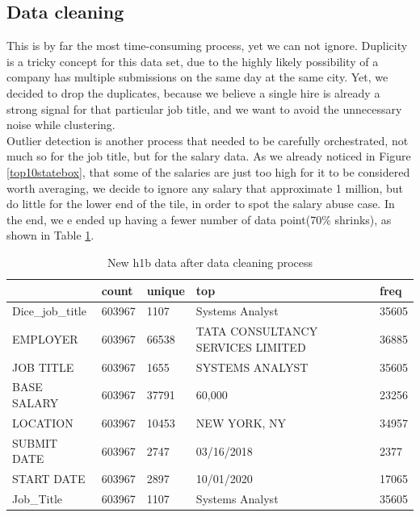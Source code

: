 \subsection{Data cleaning}
This is by far the most time-consuming process, yet we can not ignore. Duplicity is a tricky concept for this data set, due to the highly likely possibility of a company has multiple submissions on the same day at the same city. Yet, we decided to drop the duplicates, because we believe a single hire is already a strong signal for that particular job title, and we want to avoid the unnecessary noise while clustering. \\
Outlier detection is another process that needed to be carefully orchestrated, not  much so for the job title, but for the salary data. As we already noticed in Figure \ref{top10statebox}, that some of the salaries are just too high for it to be considered worth averaging, we decide to ignore any salary that approximate 1 million, but do little for the lower end of the tile, in order to spot the salary abuse case. In the end, we e ended up having a fewer number of data point(70$\%$ shrinks), as shown in Table \ref{newdata}.
\begin{table}[h!]
	\caption{New h1b data after data cleaning process}
	\label{newdata}
	\resizebox{\columnwidth}{!}
	{%
		
		\begin{tabular}{lllll}
			\hline
			{} &   count & unique &                                                top &   freq \\
			\hline
			Dice\_job\_title &  603967 &   1107 &                                    Systems Analyst &  35605 \\
			EMPLOYER       &  603967 &  66538 &                  TATA CONSULTANCY SERVICES LIMITED &  36885 \\
			JOB TITLE      &  603967 &   1655 &                                    SYSTEMS ANALYST &  35605 \\
			BASE SALARY    &  603967 &  37791 &                                             60,000 &  23256 \\
			LOCATION       &  603967 &  10453 &                                       NEW YORK, NY &  34957 \\
			SUBMIT DATE    &  603967 &   2747 &                                         03/16/2018 &   2377 \\
			START DATE     &  603967 &   2897 &                                         10/01/2020 &  17065 \\
			Job\_Title      &  603967 &   1107 &                                    Systems Analyst &  35605 \\
			\hline
		\end{tabular}
		
	}

\end{table}

